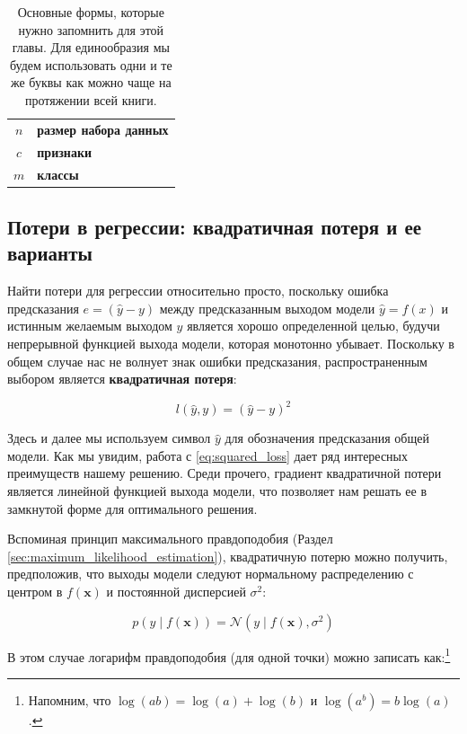 \begin{table}[t]
\centering
\caption{Основные формы, которые нужно запомнить для этой главы. Для единообразия мы будем использовать одни и те же буквы как можно чаще на протяжении всей книги.}
\begin{tabular}{@{}cl@{}}
\toprule
 $n$ & \textbf{размер набора данных} \\ $c$ & \textbf{признаки} \\ $m$ & \textbf{классы}\\ \midrule
\end{tabular}
\label{tab:shapes}
\end{table}

\subsection{Потери в регрессии: квадратичная потеря и ее варианты}

Найти потери для регрессии относительно просто, поскольку ошибка предсказания $e = (\hat{y} - y)$ между предсказанным выходом модели $\hat{y} = f(x)$ и истинным желаемым выходом $y$ является хорошо определенной целью, будучи непрерывной функцией выхода модели, которая монотонно убывает. Поскольку в общем случае нас не волнует знак ошибки предсказания, распространенным выбором является \textbf{квадратичная потеря}:

\begin{equation}
    l(\hat{y},y)=(\hat{y}-y)^2
    \label{eq:squared_loss}
\end{equation}

Здесь и далее мы используем символ $\hat{y}$ для обозначения предсказания общей модели. Как мы увидим, работа с \eqref{eq:squared_loss} дает ряд интересных преимуществ нашему решению. Среди прочего, градиент квадратичной потери является линейной функцией выхода модели, что позволяет нам решать ее в замкнутой форме для оптимального решения. 

Вспоминая принцип максимального правдоподобия (Раздел \ref{sec:maximum_likelihood_estimation}), квадратичную потерю можно получить, предположив, что выходы модели следуют нормальному распределению с центром в $f(\mathbf{x})$ и постоянной дисперсией $\sigma^2$:

$$
p(y \;\vert\; f(\mathbf{x}))=\mathcal{N}(y\;\vert\;f(\mathbf{x}), \sigma^2)
$$

В этом случае логарифм правдоподобия (для одной точки) можно записать как:\footnote{Напомним, что $\log(ab)=\log(a)+\log(b)$ и $\log(a^b)=b\log(a)$.}

